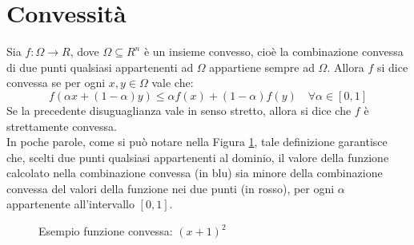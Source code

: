 \documentclass{report}
\begin{document}
\section{Convessità}
Sia $f:\Omega \rightarrow R$, dove $\Omega \subseteq R^n$ è un insieme convesso, cioè la combinazione convessa di due punti qualsiasi appartenenti ad $\Omega$ appartiene sempre ad $\Omega$. Allora $f$ si dice convessa se per ogni $x,y \in \Omega$ vale che:
\begin{equation}
    \label{funz_conv}
     f(\alpha x + (1 - \alpha) y) \leqslant \alpha f(x) + (1- \alpha) f(y) \quad \forall \alpha \in [0,1]
\end{equation}
Se la precedente disuguaglianza vale in senso stretto, allora si dice che $f$ è strettamente convessa. \\
In poche parole, come si può notare nella Figura \ref{fig:F1},  tale definizione garantisce che, scelti due punti qualsiasi appartenenti al dominio, il valore della funzione calcolato nella combinazione convessa (in blu) sia minore della combinazione convessa del valori della funzione nei due punti (in rosso), per ogni $\alpha$ appartenente all'intervallo $[0,1]$. 

\begin{figure}[h]
\center
{}
\caption{Esempio funzione convessa: $(x+1)^2$} \label{fig:F1}
\end{figure}
\end{document}
